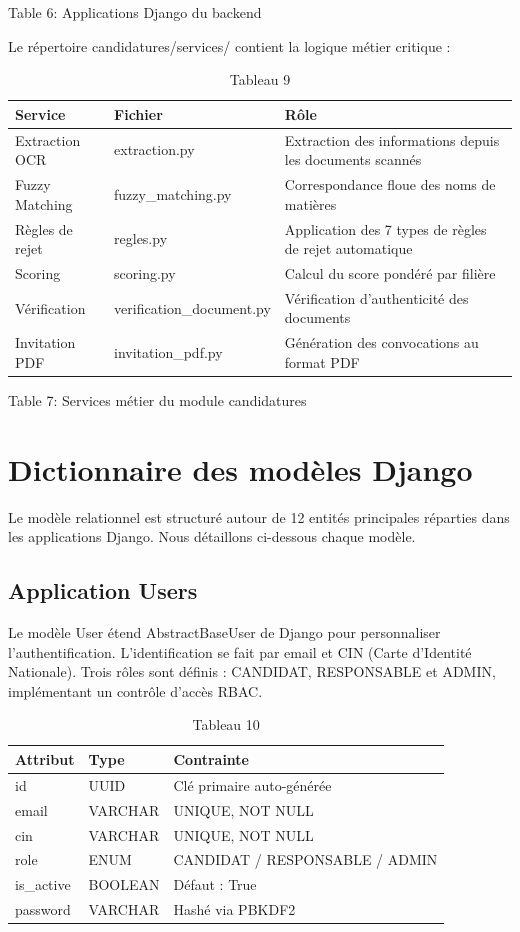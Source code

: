 Table 6: Applications Django du backend

Le répertoire candidatures/services/ contient la logique métier critique :

\begin{table}[htbp]
\centering
\begin{tabular}{|l|l|l|}
\hline
Service & Fichier & Rôle \\
\hline
Extraction OCR & extraction.py & Extraction des informations depuis les documents scannés \\
\hline
Fuzzy Matching & fuzzy\_matching.py & Correspondance floue des noms de matières \\
\hline
Règles de rejet & regles.py & Application des 7 types de règles de rejet automatique \\
\hline
Scoring & scoring.py & Calcul du score pondéré par filière \\
\hline
Vérification & verification\_document.py & Vérification d'authenticité des documents \\
\hline
Invitation PDF & invitation\_pdf.py & Génération des convocations au format PDF \\
\hline
\end{tabular}
\caption{Tableau 9}
\label{tab:table_9}
\end{table}

Table 7:  Services métier du module candidatures

\section{Dictionnaire des modèles Django}

Le modèle relationnel est structuré autour de 12 entités principales réparties dans les applications Django. Nous détaillons ci-dessous chaque modèle.

\subsection{Application Users}

Le modèle User étend AbstractBaseUser de Django pour personnaliser l'authentification. L'identification se fait par email et CIN (Carte d'Identité Nationale). Trois rôles sont définis : CANDIDAT, RESPONSABLE et ADMIN, implémentant un contrôle d'accès RBAC.

\begin{table}[htbp]
\centering
\begin{tabular}{|l|l|l|}
\hline
Attribut & Type & Contrainte \\
\hline
id & UUID & Clé primaire auto-générée \\
\hline
email & VARCHAR & UNIQUE, NOT NULL \\
\hline
cin & VARCHAR & UNIQUE, NOT NULL \\
\hline
role & ENUM & CANDIDAT / RESPONSABLE / ADMIN \\
\hline
is\_active & BOOLEAN & Défaut : True \\
\hline
password & VARCHAR & Hashé via PBKDF2 \\
\hline
\end{tabular}
\caption{Tableau 10}
\label{tab:table_10}
\end{table}

